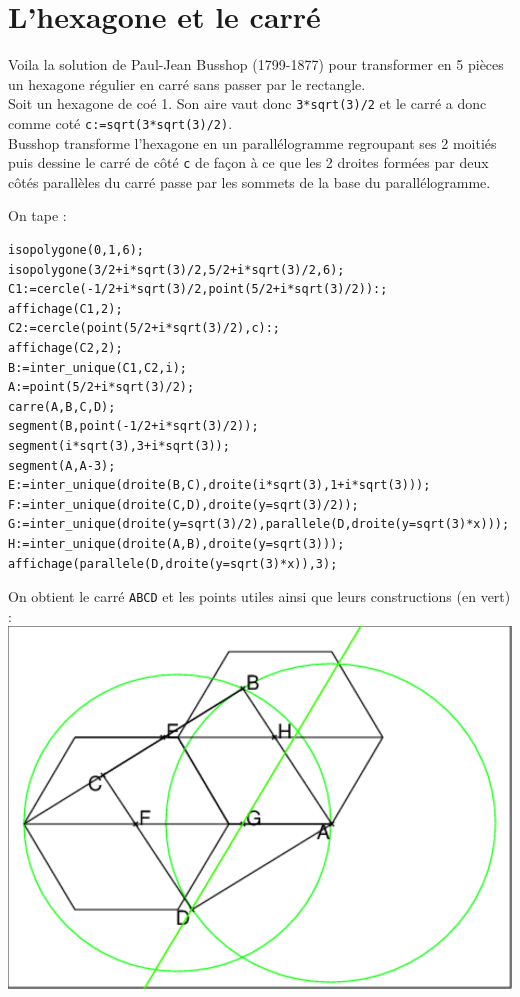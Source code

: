 \documentclass[a4paper,11pt]{book}
\begin{document}
\section{L'hexagone et le carr\'e}
Voila la solution de Paul-Jean Busshop (1799-1877) pour transformer en 5 
pi\`eces un hexagone r\'egulier en carr\'e sans passer par le rectangle.\\
Soit un hexagone de co\'e 1. Son aire vaut donc {\tt 3*sqrt(3)/2} et le carr\'e
a donc comme cot\'e {\tt c:=sqrt(3*sqrt(3)/2)}. \\
Busshop transforme l'hexagone en un parall\'elogramme regroupant ses 2 
moiti\'es puis dessine le carr\'e de c\^ot\'e {\tt c} de fa\c{c}on  \`a ce que
les 2 droites form\'ees par deux c\^ot\'es parall\`eles du carr\'e passe par 
les sommets de la base du parall\'elogramme. 

On tape :
\begin{verbatim}
isopolygone(0,1,6);
isopolygone(3/2+i*sqrt(3)/2,5/2+i*sqrt(3)/2,6);
C1:=cercle(-1/2+i*sqrt(3)/2,point(5/2+i*sqrt(3)/2)):;
affichage(C1,2);
C2:=cercle(point(5/2+i*sqrt(3)/2),c):;
affichage(C2,2);
B:=inter_unique(C1,C2,i);
A:=point(5/2+i*sqrt(3)/2);
carre(A,B,C,D);
segment(B,point(-1/2+i*sqrt(3)/2));
segment(i*sqrt(3),3+i*sqrt(3));
segment(A,A-3);
E:=inter_unique(droite(B,C),droite(i*sqrt(3),1+i*sqrt(3)));
F:=inter_unique(droite(C,D),droite(y=sqrt(3)/2));
G:=inter_unique(droite(y=sqrt(3)/2),parallele(D,droite(y=sqrt(3)*x)));
H:=inter_unique(droite(A,B),droite(y=sqrt(3)));
affichage(parallele(D,droite(y=sqrt(3)*x)),3);
\end{verbatim}
On obtient le carr\'e {\tt ABCD} et les points utiles ainsi que leurs 
constructions (en vert) :\\
\includegraphics[width=\textwidth]{puzzlehex}\\
\end{document}
